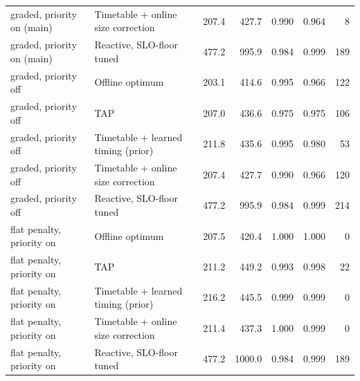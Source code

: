 \begin{tabular}{@{}llrrrrr@{}}
graded, priority on (main) & Timetable + online size correction & 207.4 & 427.7 & 0.990 & 0.964 & 8 \\
graded, priority on (main) & Reactive, SLO-floor tuned & 477.2 & 995.9 & 0.984 & 0.999 & 189 \\
graded, priority off & Offline optimum & 203.1 & 414.6 & 0.995 & 0.966 & 122 \\
graded, priority off & TAP & 207.0 & 436.6 & 0.975 & 0.975 & 106 \\
graded, priority off & Timetable + learned timing (prior) & 211.8 & 435.6 & 0.995 & 0.980 & 53 \\
graded, priority off & Timetable + online size correction & 207.4 & 427.7 & 0.990 & 0.966 & 120 \\
graded, priority off & Reactive, SLO-floor tuned & 477.2 & 995.9 & 0.984 & 0.999 & 214 \\
flat penalty, priority on & Offline optimum & 207.5 & 420.4 & 1.000 & 1.000 & 0 \\
flat penalty, priority on & TAP & 211.2 & 449.2 & 0.993 & 0.998 & 22 \\
flat penalty, priority on & Timetable + learned timing (prior) & 216.2 & 445.5 & 0.999 & 0.999 & 0 \\
flat penalty, priority on & Timetable + online size correction & 211.4 & 437.3 & 1.000 & 0.999 & 0 \\
flat penalty, priority on & Reactive, SLO-floor tuned & 477.2 & 1000.0 & 0.984 & 0.999 & 189 \\
\bottomrule
\end{tabular}
